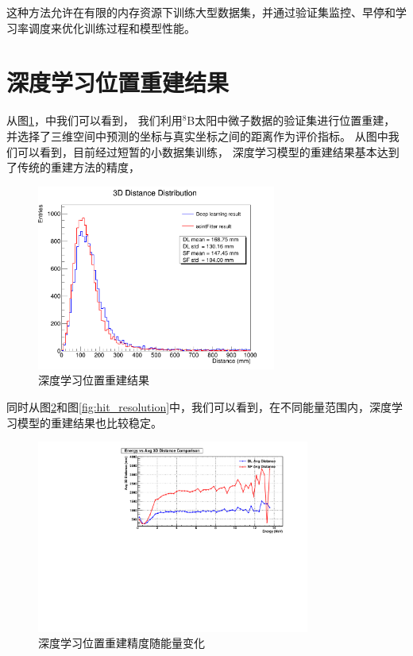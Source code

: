 这种方法允许在有限的内存资源下训练大型数据集，并通过验证集监控、早停和学习率调度来优化训练过程和模型性能。

\section{深度学习位置重建结果}

从图\ref{fig:position_reconstruction}，中我们可以看到，
我们利用${}^{8}$B太阳中微子数据的验证集进行位置重建，
并选择了三维空间中预测的坐标与真实坐标之间的距离作为评价指标。
从图中我们可以看到，目前经过短暂的小数据集训练，
深度学习模型的重建结果基本达到了传统的重建方法的精度，
\begin{figure}[htbp]
    \centering
    \includegraphics[width=0.7\textwidth]{figures/distance_distribution_comp.png}
    \caption{深度学习位置重建结果}
    \label{fig:position_reconstruction}
\end{figure}
同时从图\ref{fig:energy_resolution}和图\ref{fig:hit_resolution}中，我们可以看到，在不同能量范围内，深度学习模型的重建结果也比较稳定。
\begin{figure}[htbp]
    \centering
    \includegraphics[width=0.8\textwidth]{figures/energy_vs_dist_avg_comp.pdf}
    \caption{深度学习位置重建精度随能量变化}
    \label{fig:energy_resolution}
\end{figure}

